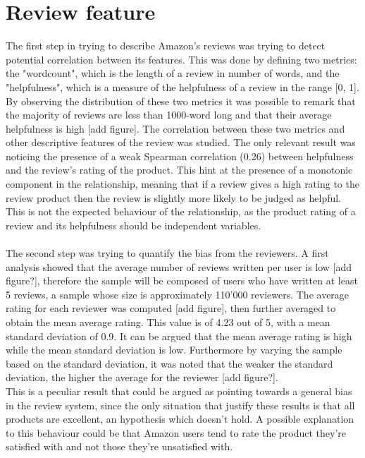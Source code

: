 \documentclass[11pt]{article}
\begin{document}
\section{Review feature}
    The first step in trying to describe Amazon's reviews was trying to detect potential correlation between its features. This was done by defining two metrics: the "wordcount", which is 
  the length of a review in number of words, and the "helpfulness", which is a measure of the helpfulness of a review in the range [0, 1]. By observing the distribution of these two metrics it was possible to remark that the majority of reviews are less than 1000-word long and that their average helpfulness is high [add figure]. The correlation between these two metrics and  other descriptive features of the review was studied. The only relevant result was noticing the presence of a weak Spearman correlation (0.26) between helpfulness and the review's rating of the product. This hint at the presence of a monotonic component in the relationship, meaning that if a review gives a high rating to the review product then the review is slightly more likely to be judged as helpful. This is not the expected behaviour of the relationship, as the product rating of a review and its helpfulness should be independent variables.\\\\
The second step was trying to quantify the bias from the reviewers. A first analysis showed that the average number of reviews written per user is low [add figure?], therefore the sample will be composed of users who have written at least 5 reviews, a sample whose size is approximately 110'000 reviewers. The average rating for each reviewer was computed [add figure], then further averaged to obtain the mean average rating. This value is of 4.23 out of 5, with a mean standard deviation of 0.9. It can be argued that the mean average rating is high while the mean standard deviation is low. Furthermore by varying the sample based on the standard deviation, it was noted that the weaker the standard deviation, the higher the average for the reviewer [add figure?].\\ This is a peculiar result that could be argued as pointing towards a general bias in the review system, since the only situation that justify these results is that all products are excellent, an hypothesis which doesn't hold. A possible explanation to this behaviour could be that Amazon users  tend to rate the product they're satisfied with and not those they're unsatisfied with.\\\\
\end{document}
